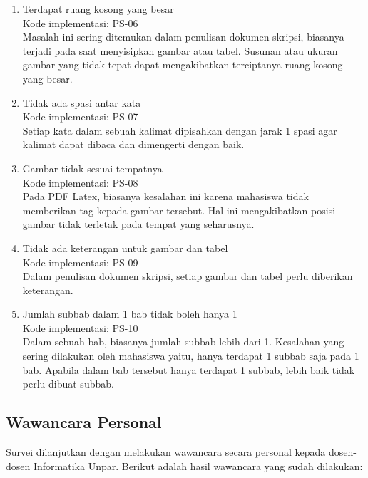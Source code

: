 \begin{enumerate}
	\item Terdapat ruang kosong yang besar \\
	Kode implementasi: PS-06 \\	
	Masalah ini sering ditemukan dalam penulisan dokumen skripsi, biasanya terjadi pada saat menyisipkan gambar atau tabel. Susunan atau ukuran gambar yang tidak tepat dapat mengakibatkan terciptanya ruang kosong yang besar.

	\item Tidak ada spasi antar kata \\
	Kode implementasi: PS-07 \\	
	Setiap kata dalam sebuah kalimat dipisahkan dengan jarak 1 spasi agar kalimat dapat dibaca dan dimengerti dengan baik.

	\item Gambar tidak sesuai tempatnya \\
	Kode implementasi: PS-08 \\	
	Pada PDF Latex, biasanya kesalahan ini karena mahasiswa tidak memberikan tag kepada gambar tersebut. Hal ini mengakibatkan posisi gambar tidak terletak pada tempat yang seharusnya.

	\item Tidak ada keterangan untuk gambar dan tabel \\
	Kode implementasi: PS-09 \\	
	Dalam penulisan dokumen skripsi, setiap gambar dan tabel perlu diberikan keterangan.

	\item Jumlah subbab dalam 1 bab tidak boleh hanya 1 \\
	Kode implementasi: PS-10 \\	
	Dalam sebuah bab, biasanya jumlah subbab lebih dari 1. Kesalahan yang sering dilakukan oleh mahasiswa yaitu, hanya terdapat 1 subbab saja pada 1 bab. Apabila dalam bab tersebut hanya terdapat 1 subbab, lebih baik tidak perlu dibuat subbab.
	
\end{enumerate}

\subsection{Wawancara Personal}
Survei dilanjutkan dengan melakukan wawancara secara personal kepada dosen-dosen Informatika Unpar. Berikut adalah hasil wawancara yang sudah dilakukan:

